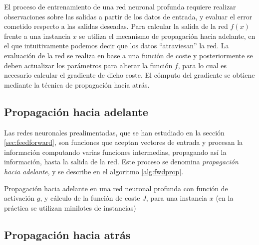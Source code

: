 El proceso de entrenamiento de una red neuronal profunda
requiere realizar observaciones sobre las salidas a partir de los datos
de entrada, y evaluar el error cometido respecto a las salidas deseadas.
Para calcular la salida de la red $f(x)$ frente a una instancia $x$ se
utiliza el mecanismo de propagación hacia adelante, en el que intuitivamente
podemos decir que los datos ``atraviesan'' la red. La evaluación de la
red se realiza en base a una función de coste y posteriormente se deben
actualizar los parámetros para alterar la función $f$, para lo cual es
necesario calcular el gradiente de dicho coste. El cómputo del gradiente
se obtiene mediante la técnica de propagación hacia atrás.

\subsection{Propagación hacia
adelante}\label{propagaciuxf3n-hacia-adelante}

Las redes neuronales prealimentadas, que se han estudiado en la sección
\ref{sec:feedforward}, son funciones que aceptan vectores de entrada y
procesan la información computando varias funciones intermedias,
propagando así la información, hasta la salida de la red. Este proceso
se denomina \emph{propagación hacia adelante}, y se describe en el
algoritmo \ref{alg:fwdprop}.

\begin{algorithm}
\caption{Propagación hacia adelante en una red neuronal profunda con función de activación $g$, y cálculo de la función de coste $J$, para una instancia $x$ (en la práctica se utilizan minilotes de instancias)}
\label{alg:fwdprop}
\begin{algorithmic}
  \ENDFOR
\end{algorithmic}
\end{algorithm}

\subsection{Propagación hacia
atrás}\label{sec:backprop}

